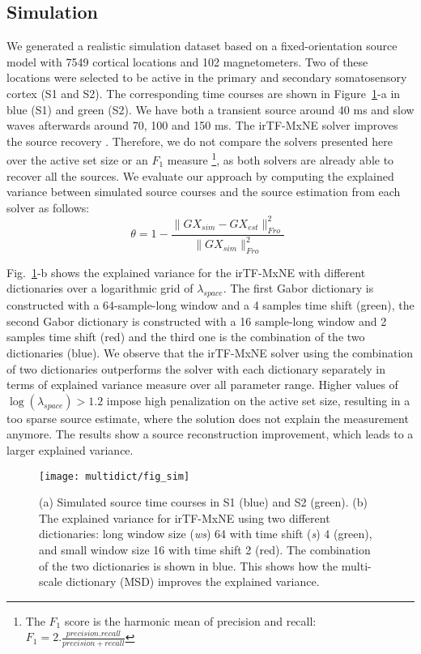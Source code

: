\subsection{Simulation}
We generated a realistic simulation dataset based on a fixed-orientation source model with 7549 cortical locations and 102 magnetometers. Two of these locations were selected to be active in the primary and secondary somatosensory cortex (S1 and S2). The corresponding time courses are shown in Figure~\ref{fig:simulation}-a in blue (S1) and green (S2). We have both a transient source around 40 ms and slow waves afterwards around 70, 100 and 150 ms. The irTF-MxNE solver improves the source recovery \cite{daniel15}. Therefore, we do not compare the solvers presented here over the active set size or an $F_1$ measure \footnote{The $F_1$ score is the harmonic mean of precision and recall: $F_1=2.\frac{precision . recall}{precision + recall}$}, %
as both solvers are already able to recover all the sources. %
We evaluate our approach by computing  %
the explained variance between simulated source courses and the source estimation from each solver as follows:
\begin{equation}
	\theta = 1 - \frac{\|GX_{sim}-GX_{est}\|^2_{Fro}}{\|GX_{sim}\|^2_{Fro}} \enspace
\end{equation}

Fig.~\ref{fig:simulation}-b shows the explained variance for the irTF-MxNE with different dictionaries over a logarithmic grid of $\lambda_{space}$. The first Gabor dictionary is constructed with a 64-sample-long window and a 4 samples time shift (green), the second Gabor dictionary is constructed with a 16 sample-long window and 2 samples time shift (red) and the third one is the combination of the two dictionaries (blue). We observe that the irTF-MxNE solver using the combination of two dictionaries outperforms the solver with each dictionary separately in terms of explained variance measure over all parameter range. Higher values of $\log(\lambda_{space})>1.2$ impose high penalization on the active set size, resulting in a too sparse source estimate, where the solution does not explain the measurement anymore. The results show a source reconstruction improvement, which leads to a larger explained variance.

\begin{figure}
\centering
	\texttt{[image: multidict/fig\_sim]}
    \caption{(a) Simulated source time courses in S1 (blue) and S2 (green). (b) The explained variance for irTF-MxNE using two different dictionaries: long window size (\textit{ws}) 64 with time shift (\textit{s}) 4 (green), and small window size 16 with time shift 2 (red). The combination of the two dictionaries is shown in blue. This shows how the multi-scale dictionary (MSD) improves the explained variance.}
    \label{fig:simulation}
\end{figure}

